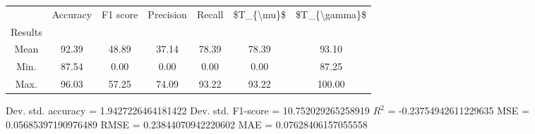 \begin{tabular}{|c|c|c|c|c|c|c|}
\toprule
{} &  Accuracy &  F1 score &  Precision &  Recall &  \$T\_\{\textbackslash mu\}\$ &  \$T\_\{\textbackslash gamma\}\$ \\
Results &           &           &            &         &            &               \\
\hline
Mean    &     92.39 &     48.89 &      37.14 &   78.39 &      78.39 &         93.10 \\
Min.    &     87.54 &      0.00 &       0.00 &    0.00 &       0.00 &         87.25 \\
Max.    &     96.03 &     57.25 &      74.09 &   93.22 &      93.22 &        100.00 \\
\bottomrule
\end{tabular}

 Dev. std. accuracy = 1.9427226464181422
 Dev. std. F1-score = 10.752029265258919
 $R^2$ = -0.23754942611229635
 MSE = 0.05685397190976489
 RMSE = 0.23844070942220602
 MAE = 0.07628406157055558